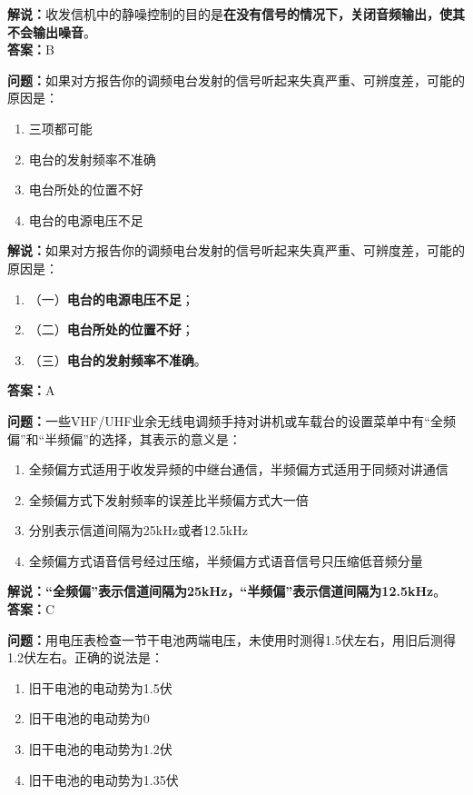 \documentclass{ctexbook}
\begin{document}
\noindent\textbf{解说：}收发信机中的静噪控制的目的是\textbf{在没有信号的情况下，关闭音频输出，使其不会输出噪音}。\\\noindent\textbf{答案：}B%
\bigskip


\noindent\textbf{问题：}如果对方报告你的调频电台发射的信号听起来失真严重、可辨度差，可能的原因是：

\begin{enumerate}[label=\Alph*), leftmargin=3em]
	\item 三项都可能
	\item 电台的发射频率不准确
	\item 电台所处的位置不好
	\item 电台的电源电压不足
\end{enumerate}

\noindent\textbf{解说：}如果对方报告你的调频电台发射的信号听起来失真严重、可辨度差，可能的原因是：
\begin{enumerate}[label=, leftmargin=0.8em]
	\item （一）\textbf{电台的电源电压不足}；
	\item （二）\textbf{电台所处的位置不好}；
	\item （三）\textbf{电台的发射频率不准确}。
\end{enumerate}
\noindent\textbf{答案：}A

\bigskip


\noindent\textbf{问题：}一些VHF/UHF业余无线电调频手持对讲机或车载台的设置菜单中有“全频偏”和“半频偏”的选择，其表示的意义是：

\begin{enumerate}[label=\Alph*), leftmargin=3em]
	\item 全频偏方式适用于收发异频的中继台通信，半频偏方式适用于同频对讲通信
	\item 全频偏方式下发射频率的误差比半频偏方式大一倍
	\item 分别表示信道间隔为25kHz或者12.5kHz
	\item 全频偏方式语音信号经过压缩，半频偏方式语音信号只压缩低音频分量
\end{enumerate}

\noindent\textbf{解说：}\textbf{“全频偏”表示信道间隔为25kHz，“半频偏”表示信道间隔为12.5kHz}。\\\noindent\textbf{答案：}C

\bigskip


\noindent\textbf{问题：}用电压表检查一节干电池两端电压，未使用时测得1.5伏左右，用旧后测得1.2伏左右。正确的说法是：

\begin{enumerate}[label=\Alph*), leftmargin=3em]
	\item 旧干电池的电动势为1.5伏
	\item 旧干电池的电动势为0
	\item 旧干电池的电动势为1.2伏
	\item 旧干电池的电动势为1.35伏
\end{enumerate}
\end{document}
